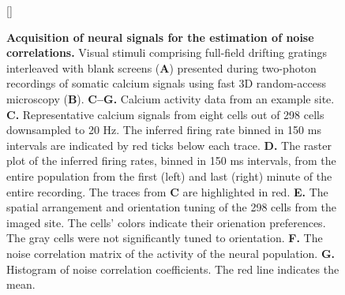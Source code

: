 \documentclass[10pt]{article}
\begin{document}
\begin{figure}    [\FBwidth]
    {\caption{{\bf Acquisition of neural signals for the estimation of noise correlations.}
    Visual stimuli comprising full-field drifting gratings interleaved with blank screens ({\bf A}) presented during two-photon recordings of somatic calcium signals using fast 3D random-access microscopy ({\bf B}). 
    {\bf C--G.} Calcium activity data from an example site.
    {\bf C.} Representative calcium signals from eight cells out of 298 cells downsampled to 20 Hz. The inferred firing rate binned in 150 ms intervals are indicated by red ticks below each trace.
    {\bf D.} The raster plot of the inferred firing rates, binned in 150 ms intervals, from the entire population from the first (left) and last (right) minute of the entire recording.  The traces from {\bf C} are highlighted in red.
    {\bf E.} The spatial arrangement and orientation tuning of the 298 cells from the imaged site. The cells' colors indicate their orienation preferences. The gray cells were not significantly tuned to orientation.
    {\bf F.} The noise correlation matrix of the activity of the neural population. 
    {\bf G.} Histogram of noise correlation coefficients. The red line indicates the mean.
} \label{fig:03}}

\end{figure}
\end{document}
